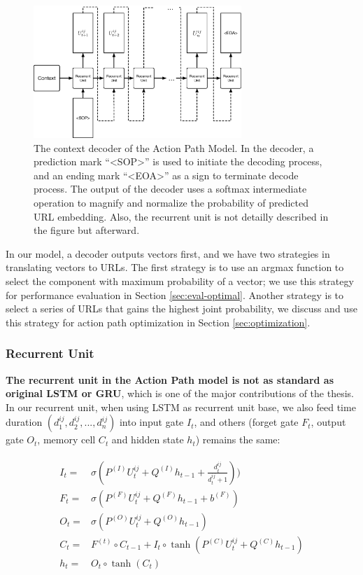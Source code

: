 \begin{figure}
    \centering
    \includegraphics[width=0.7\textwidth]{figures/decoder}
    \caption{The context decoder of the Action Path Model. In the decoder, 
    a prediction mark ``<SOP>'' is used to initiate the decoding process, 
    and an ending mark ``<EOA>'' as a sign to terminate decode process. 
    The output of the decoder uses a softmax intermediate operation to magnify 
    and normalize the probability of predicted URL embedding. Also, the recurrent unit 
    is not detailly described in the figure but afterward.}
    \label{fig:decoder}
\end{figure}

In our model, a decoder outputs vectors first, and we have two strategies 
in translating vectors to URLs. 
The first strategy is to use an argmax function to select the component 
with maximum probability of a vector; we use this strategy for performance evaluation 
in Section \ref{sec:eval-optimal}. Another strategy is to select a series of URLs 
that gains the highest joint probability,  we discuss and use this strategy 
for action path optimization in Section \ref{sec:optimization}.

\subsubsection{Recurrent Unit}
\label{sec:recurrent-unit}

\textbf{The recurrent unit in the Action Path model is not as standard as original 
LSTM or GRU}, which is one of the major contributions of the thesis. 
In our recurrent unit, when using LSTM as recurrent unit base, we also 
feed time duration $(d^{ij}_1, d^{ij}_2, ..., d^{ij}_n)$
into input gate $I_t$, and others (forget gate $F_t$, output gate $O_t$, 
memory cell $C_t$ and hidden state $h_t$) remains the same:

\begin{align}
\label{eqn:lstm}
\begin{split}
    I_t =& \sigma ( P^{(I)} U^{ij}_t + Q^{(I)} h_{t-1} + \frac{d^{ij}_t}{d^{ij}_t + 1}) ) \\
    F_t =& \sigma ( P^{(F)} U^{ij}_t + Q^{(F)} h_{t-1} + b^{(F)}) \\
    O_t =& \sigma ( P^{(O)} U^{ij}_t + Q^{(O)} h_{t-1} ) \\
    C_t =& F^{(t)} \circ C_{t-1} + I_t \circ \tanh (P^{(C)} U^{ij}_t + Q^{(C)} h_{t-1}) \\
    h_t =& O_t \circ \tanh (C_t)
\end{split}
\end{align}

